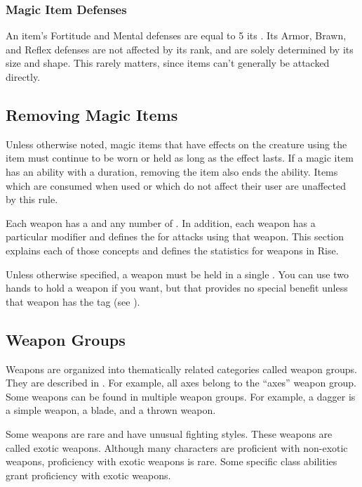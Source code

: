    \subsubsection{Magic Item Defenses}\label{Magic Item Defenses}
      An item's Fortitude and Mental defenses are equal to 5 \add its .
      Its Armor, Brawn, and Reflex defenses are not affected by its rank, and are solely determined by its size and shape.
      This rarely matters, since  items can't generally be attacked directly.

  \subsection{Removing Magic Items}
    Unless otherwise noted, magic items that have effects on the creature using the item must continue to be worn or held as long as the effect lasts.
    If a magic item has an ability with a duration, removing the item also ends the ability.
    Items which are consumed when used or which do not affect their user are unaffected by this rule.

\newpage
{}

  Each weapon has a  and any number of .
  In addition, each weapon has a particular  modifier and defines the  for attacks using that weapon.
  This section explains each of those concepts and defines the statistics for weapons in Rise.

  Unless otherwise specified, a weapon must be held in a single .
  You can use two hands to hold a weapon if you want, but that provides no special benefit unless that weapon has the  tag (see ).

  \subsection{Weapon Groups}\label{Weapon Groups}
    Weapons are organized into thematically related categories called weapon groups. They are described in . For example, all axes belong to the ``axes'' weapon group. Some weapons can be found in multiple weapon groups. For example, a dagger is a simple weapon, a blade, and a thrown weapon.

     Some weapons are rare and have unusual fighting styles.
    These weapons are called exotic weapons.
    Although many characters are proficient with non-exotic weapons, proficiency with exotic weapons is rare.
    Some specific class abilities grant proficiency with exotic weapons.

